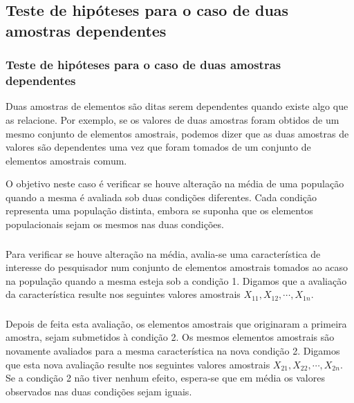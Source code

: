 \documentclass[14pt,aspectratio=1610]{beamer}
\begin{document}
\subsection{Teste de hipóteses para o caso de duas amostras dependentes}
\begin{frame}{}
\frametitle{Teste de hipóteses para o caso de duas amostras dependentes}
\begin{block}{}
\justifying
Duas amostras de elementos são ditas serem dependentes quando existe algo que as relacione. Por exemplo, se os valores de duas amostras foram obtidos de um mesmo conjunto de elementos amostrais, podemos dizer que as duas amostras de valores são dependentes uma vez que foram tomados de um conjunto de elementos
amostrais comum.
\end{block}
\pause
\begin{block}{}
\justifying
O objetivo neste caso é verificar se houve alteração na média de uma população
quando a mesma é avaliada sob duas condições diferentes. Cada condição representa
uma população distinta, embora se suponha que os elementos populacionais sejam os
mesmos nas duas condições.
\end{block}
\end{frame}

\begin{frame}{}
\frametitle{}
\begin{block}{}
\justifying
Para verificar se houve alteração na média, avalia-se uma característica de interesse do pesquisador num conjunto de elementos amostrais tomados ao acaso na população quando a mesma esteja sob a condição 1. Digamos que a avaliação da característica resulte nos seguintes valores amostrais $X_{11},X_{12},\cdots,X_{1n}$.
\end{block}
\end{frame}

\begin{frame}{}
\frametitle{}
\begin{block}{}
\justifying
Depois de feita esta avaliação, os elementos amostrais que originaram a primeira amostra, sejam submetidos à condição 2. Os mesmos elementos amostrais são novamente avaliados para a mesma característica na nova condição 2. Digamos que esta nova avaliação resulte nos seguintes valores amostrais $X_{21},X_{22},\cdots,X_{2n}$. 
Se a condição 2 não tiver nenhum efeito, espera-se que em média os valores observados nas duas condições sejam iguais.
\end{block}
\end{frame}
\end{document}
